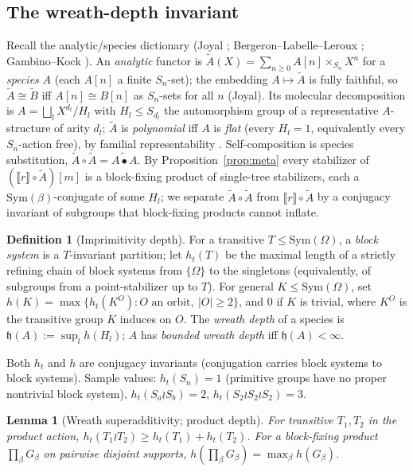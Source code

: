 \documentclass[11pt]{amsart}
\theoremstyle{plain}
\newtheorem{lemma}[theorem]{Lemma}
\theoremstyle{definition}
\newtheorem{definition}[theorem]{Definition}
\newcommand{\ext}[1]{\llbracket #1 \rrbracket}
\begin{document}
\subsection{The wreath-depth invariant}\label{sec:depth}
Recall the analytic/species dictionary (Joyal \cite{Joyal}; Bergeron--Labelle--Leroux \cite{BLL};
Gambino--Kock \cite{GambinoKock}). An \emph{analytic} functor is $\tilde A(X)=\sum_{n\ge0}A[n]\times_{S_n}
X^{n}$ for a \emph{species} $A$ (each $A[n]$ a finite $S_n$-set); the embedding $A\mapsto\tilde A$ is
fully faithful, so $\tilde A\cong\tilde B$ iff $A[n]\cong B[n]$ as $S_n$-sets for all $n$ (Joyal). Its
molecular decomposition is $A=\bigsqcup_l X^{d_l}/H_l$ with $H_l\le S_{d_l}$ the automorphism group of a
representative $A$-structure of arity $d_l$; $\tilde A$ is \emph{polynomial} iff $A$ is \emph{flat}
(every $H_l=1$, equivalently every $S_n$-action free), by familial representability
\cite[\S1]{GambinoKock}. Self-composition is species substitution, $\tilde A\circ\tilde A=\widetilde{A
\bullet A}$. By Proposition~\ref{prop:meta} every stabilizer of $(\ext r\circ\tilde A)[m]$ is a
block-fixing product of single-tree stabilizers, each a $\mathrm{Sym}(\beta)$-conjugate of some $H_l$;
we separate $\tilde A\circ\tilde A$ from $\ext r\circ\tilde A$ by a conjugacy invariant of subgroups
that block-fixing products cannot inflate.

\begin{definition}[Imprimitivity depth]\label{def:depth}
For a transitive $T\le\mathrm{Sym}(\Omega)$, a \emph{block system} is a $T$-invariant partition; let
$h_t(T)$ be the maximal length of a strictly refining chain of block systems from $\{\Omega\}$ to the
singletons (equivalently, of subgroups from a point-stabilizer up to $T$). For general
$K\le\mathrm{Sym}(\Omega)$, set $h(K)=\max\{h_t(K^O):O\text{ an orbit},\ |O|\ge2\}$, and $0$ if $K$ is
trivial, where $K^O$ is the transitive group $K$ induces on $O$. The \emph{wreath depth} of a species
is $\mathfrak h(A):=\sup_l h(H_l)$; $A$ has \emph{bounded wreath depth} iff $\mathfrak h(A)<\infty$.
\end{definition}

Both $h_t$ and $h$ are conjugacy invariants (conjugation carries block systems to block systems).
Sample values: $h_t(S_n)=1$ (primitive groups have no proper nontrivial block system),
$h_t(S_a\wr S_b)=2$, $h_t(S_2\wr S_2\wr S_2)=3$.

\begin{lemma}[Wreath superadditivity; product depth]\label{lem:wreath}
For transitive $T_1,T_2$ in the product action, $h_t(T_1\wr T_2)\ge h_t(T_1)+h_t(T_2)$. For a
block-fixing product $\prod_\beta G_\beta$ on pairwise disjoint supports,
$h(\prod_\beta G_\beta)=\max_\beta h(G_\beta)$.
\end{lemma}
\end{document}
